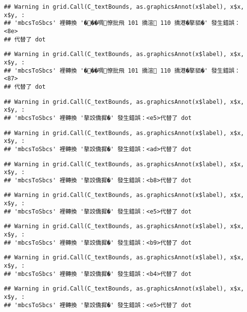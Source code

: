 \documentclass[
]{article}
\begin{document}
\begin{verbatim}
## Warning in grid.Call(C_textBounds, as.graphicsAnnot(x$label), x$x, x$y, :
## 'mbcsToSbcs' 裡轉換 '���啁憭批飛 101 撟渲 110 撟港�摮貊�' 發生錯誤：<8e>
## 代替了 dot
\end{verbatim}

\begin{verbatim}
## Warning in grid.Call(C_textBounds, as.graphicsAnnot(x$label), x$x, x$y, :
## 'mbcsToSbcs' 裡轉換 '���啁憭批飛 101 撟渲 110 撟港�摮貊�' 發生錯誤：<87>
## 代替了 dot
\end{verbatim}

\begin{verbatim}
## Warning in grid.Call(C_textBounds, as.graphicsAnnot(x$label), x$x, x$y, :
## 'mbcsToSbcs' 裡轉換 '摮詨僑摨�' 發生錯誤：<e5>代替了 dot
\end{verbatim}

\begin{verbatim}
## Warning in grid.Call(C_textBounds, as.graphicsAnnot(x$label), x$x, x$y, :
## 'mbcsToSbcs' 裡轉換 '摮詨僑摨�' 發生錯誤：<ad>代替了 dot
\end{verbatim}

\begin{verbatim}
## Warning in grid.Call(C_textBounds, as.graphicsAnnot(x$label), x$x, x$y, :
## 'mbcsToSbcs' 裡轉換 '摮詨僑摨�' 發生錯誤：<b8>代替了 dot
\end{verbatim}

\begin{verbatim}
## Warning in grid.Call(C_textBounds, as.graphicsAnnot(x$label), x$x, x$y, :
## 'mbcsToSbcs' 裡轉換 '摮詨僑摨�' 發生錯誤：<e5>代替了 dot
\end{verbatim}

\begin{verbatim}
## Warning in grid.Call(C_textBounds, as.graphicsAnnot(x$label), x$x, x$y, :
## 'mbcsToSbcs' 裡轉換 '摮詨僑摨�' 發生錯誤：<b9>代替了 dot
\end{verbatim}

\begin{verbatim}
## Warning in grid.Call(C_textBounds, as.graphicsAnnot(x$label), x$x, x$y, :
## 'mbcsToSbcs' 裡轉換 '摮詨僑摨�' 發生錯誤：<b4>代替了 dot
\end{verbatim}

\begin{verbatim}
## Warning in grid.Call(C_textBounds, as.graphicsAnnot(x$label), x$x, x$y, :
## 'mbcsToSbcs' 裡轉換 '摮詨僑摨�' 發生錯誤：<e5>代替了 dot
\end{verbatim}
\end{document}
